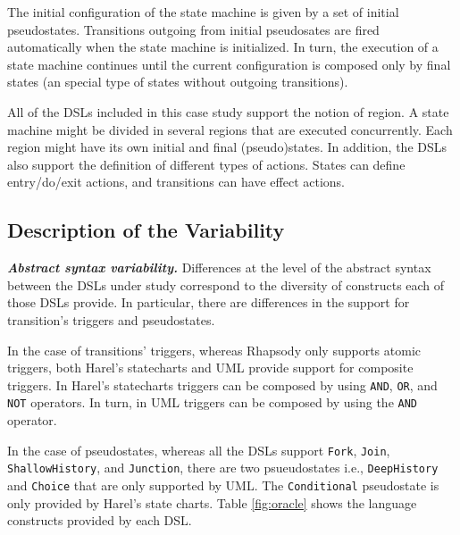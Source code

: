 The initial configuration of the state machine is given by a set of initial pseudostates.  Transitions outgoing from initial pseudosates are fired automatically when the state machine is initialized. In turn, the execution of a state machine continues until the current configuration is composed only by final states (an special type of states without outgoing transitions).

All of the DSLs included in this case study support the notion of region. A state machine might be divided in several regions that are executed concurrently. Each region might have its own initial and final (pseudo)states. In addition, the DSLs also support the definition of different types of actions. States can define entry/do/exit actions, and transitions can have effect actions. 

\subsection{Description of the Variability}

\vspace{2mm}
\textit{\textbf{Abstract syntax variability.}} Differences at the level of the abstract syntax between the DSLs under study correspond to the diversity of constructs each of those DSLs provide. In particular, there are differences in the support for transition's triggers and pseudostates. 

In the case of transitions' triggers, whereas Rhapsody only supports atomic triggers, both Harel's statecharts and UML provide support for composite triggers. In Harel's statecharts triggers can be composed by using \texttt{AND}, \texttt{OR}, and \texttt{NOT} operators. In turn, in UML triggers can be composed by using the \texttt{AND} operator.

In the case of pseudostates, whereas all the DSLs support \texttt{Fork}, \texttt{Join}, \texttt{ShallowHistory}, and \texttt{Junction}, there are two psueudostates i.e., \texttt{DeepHistory} and \texttt{Choice} that are only supported by UML. The \texttt{Conditional} pseudostate is only provided by Harel's state charts. Table \ref{fig:oracle} shows the language constructs provided by each DSL.

